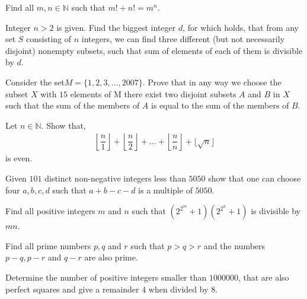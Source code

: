 \documentclass[problems.tex]{subfile}
\begin{document}
	\begin{problem}[Belarus $2009$]
		Find all $m,n\in\mathbb{N}$ such that $m!+n!=m^n$.
	\end{problem}

	\begin{problem}
		Integer $n>2$ is given. Find the biggest integer $d$, for which holds, that from any set $S$ consisting of $n$ integers, we can find three different (but not necessarily disjoint) nonempty subsets, such that sum of elements of each of them is divisible by $d$.
	\end{problem}

	\begin{problem}
		Consider the set$ M = \{1, 2, 3, . . . , 2007\}$. Prove that in any way we choose the subset $X$ with $15$ elements of M there exist two disjoint subsets         $A$ and $B$ in $X$ such that the sum of the members of $A$ is equal to the sum of the members of $B$.
	\end{problem}

	\begin{problem}[India $2014$]
		Let $n\in\mathbb{N}$. Show that,
			\begin{align*}
				\left\lfloor\dfrac{n}{1}\right\rfloor+\left\lfloor\dfrac{n}{2}\right\rfloor+\ldots+\left\lfloor\dfrac{n}{n}\right\rfloor+
				\lfloor\sqrt{n}\rfloor
			\end{align*}
		is even.
	\end{problem}

	\begin{problem}
		Given $101$ distinct non-negative integers less than $5050$ show that one can choose four $a, b, c, d$ such that $a + b - c - d$ is a multiple of $5050$.
	\end{problem}

	\begin{problem}
		Find all positive integers $m$ and $n$ such that $\left(2^{2^m}+1\right)\left(2^{2^n}+1\right)$ is divisible by $mn$.
	\end{problem}

	\begin{problem}[Slovenia $2010$]
		Find all prime numbers $p, q$ and $r$ such that $p > q > r$ and the numbers $p-q,p-r$ and $q-r$ are also prime.
	\end{problem}

	\begin{problem}
		Determine the number of positive integers smaller than $1000000$, that are also perfect squares and give a remainder $4$ when divided by $8$.
	\end{problem}
\end{document}
